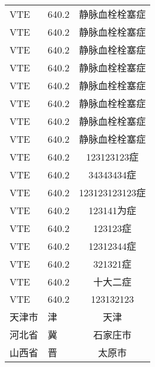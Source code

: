 \begin{longtable}{p{2cm}p{5cm}c}
	VTE & 640.2 & 静脉血栓栓塞症 \\
	VTE & 640.2 & 静脉血栓栓塞症 \\
	VTE & 640.2 & 静脉血栓栓塞症 \\
	VTE & 640.2 & 静脉血栓栓塞症 \\
	VTE & 640.2 & 静脉血栓栓塞症 \\
	VTE & 640.2 & 静脉血栓栓塞症 \\
	VTE & 640.2 & 静脉血栓栓塞症 \\
	VTE & 640.2 & 静脉血栓栓塞症 \\
	VTE & 640.2 & 123123123症 \\
	VTE & 640.2 & 34343434症 \\
	VTE & 640.2 & 123123123123症 \\
	VTE & 640.2 & 123141为症 \\
	VTE & 640.2 & 123123症 \\
	VTE & 640.2 & 12312344症 \\
	VTE & 640.2 & 321321症 \\
	VTE & 640.2 & 十大二症 \\
	VTE & 640.2 & 123132123\\
	天津市 & 津 & 天津\\
	河北省 & 冀 & 石家庄市\\
	山西省 & 晋 & 太原市\\
\end{longtable}
